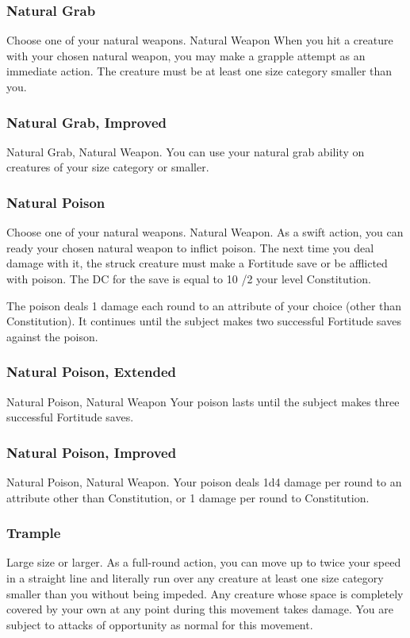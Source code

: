 \subsubsection{Natural Grab}
Choose one of your natural weapons.
\featpre Natural Weapon
\featben When you hit a creature with your chosen natural weapon, you may make a grapple attempt as an immediate action. The creature must be at least one size category smaller than you.

\subsubsection{Natural Grab, Improved}
\featpre Natural Grab, Natural Weapon.
\featben You can use your natural grab ability on creatures of your size category or smaller.

\subsubsection{Natural Poison}
Choose one of your natural weapons.
\featpre Natural Weapon.
\featben As a swift action, you can ready your chosen natural weapon to inflict poison. The next time you deal damage with it, the struck creature must make a Fortitude save or be afflicted with poison. The DC for the save is equal to 10 /2 your level \add Constitution.
\par The poison deals 1 damage each round to an attribute of your choice (other than Constitution). It continues until the subject makes two successful Fortitude saves against the poison.

\subsubsection{Natural Poison, Extended}
\featpre Natural Poison, Natural Weapon
\featben Your poison lasts until the subject makes three successful Fortitude saves.

\subsubsection{Natural Poison, Improved}
\featpre Natural Poison, Natural Weapon.
\featben Your poison deals 1d4 damage per round to an attribute other than Constitution, or 1 damage per round to Constitution.

\subsubsection{Trample}
\featpre Large size or larger.
\featben As a full-round action, you can move up to twice your speed in a straight line and literally run over any creature at least one size category smaller than you without being impeded. Any creature whose space is completely covered by your own at any point during this movement takes damage. You are subject to attacks of opportunity as normal for this movement.

